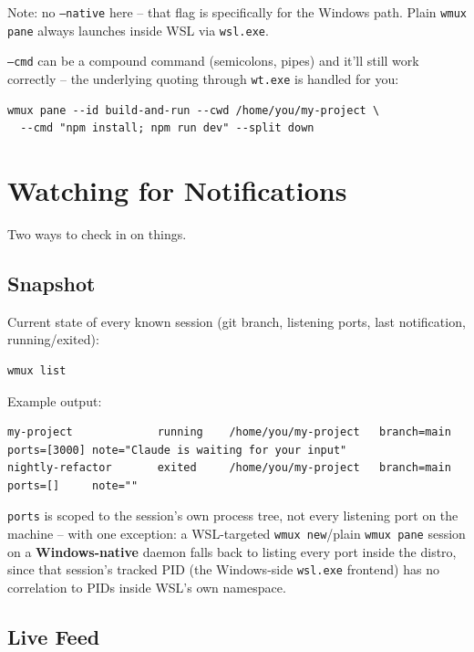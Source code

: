 \documentclass{article}
\begin{document}
Note: no \texttt{--native} here -- that flag is specifically for the Windows path. Plain \texttt{wmux pane} always launches inside WSL via \texttt{wsl.exe}.

\texttt{--cmd} can be a compound command (semicolons, pipes) and it'll still work correctly -- the underlying quoting through \texttt{wt.exe} is handled for you:

\begin{lstlisting}
wmux pane --id build-and-run --cwd /home/you/my-project \
  --cmd "npm install; npm run dev" --split down
\end{lstlisting}

\section{Watching for Notifications}

Two ways to check in on things.

\subsection{Snapshot}

Current state of every known session (git branch, listening ports, last notification, running/exited):

\begin{lstlisting}
wmux list
\end{lstlisting}

Example output:

\begin{lstlisting}
my-project             running    /home/you/my-project   branch=main   ports=[3000] note="Claude is waiting for your input"
nightly-refactor       exited     /home/you/my-project   branch=main   ports=[]     note=""
\end{lstlisting}

\texttt{ports} is scoped to the session's own process tree, not every listening port on the machine -- with one exception: a WSL-targeted \texttt{wmux new}/plain \texttt{wmux pane} session on a \textbf{Windows-native} daemon falls back to listing every port inside the distro, since that session's tracked PID (the Windows-side \texttt{wsl.exe} frontend) has no correlation to PIDs inside WSL's own namespace.

\subsection{Live Feed}
\end{document}
